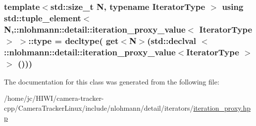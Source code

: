 \subsubsection[{\texorpdfstring{type}{type}}]{\setlength{\rightskip}{0pt plus 5cm}template$<$std\+::size\+\_\+t N, typename Iterator\+Type $>$ using std\+::tuple\+\_\+element$<$ N,\+::{\bf nlohmann\+::detail\+::iteration\+\_\+proxy\+\_\+value}$<$ Iterator\+Type $>$ $>$\+::{\bf type} =  decltype( get$<$N$>$(std\+::declval $<$ \+::{\bf nlohmann\+::detail\+::iteration\+\_\+proxy\+\_\+value}$<$Iterator\+Type $>$$>$ ()))}\hypertarget{classstd_1_1tuple__element_3_01_n_00_1_1nlohmann_1_1detail_1_1iteration__proxy__value_3_01_iterator_type_01_4_01_4_a9469c97fd711b823af47c1ff75a09ada}{}\label{classstd_1_1tuple__element_3_01_n_00_1_1nlohmann_1_1detail_1_1iteration__proxy__value_3_01_iterator_type_01_4_01_4_a9469c97fd711b823af47c1ff75a09ada}


The documentation for this class was generated from the following file\+:\begin{DoxyCompactItemize}
\item 
/home/jc/\+H\+I\+W\+I/camera-\/tracker-\/cpp/\+Camera\+Tracker\+Linux/include/nlohmann/detail/iterators/\hyperlink{iteration__proxy_8hpp}{iteration\+\_\+proxy.\+hpp}\end{DoxyCompactItemize}

